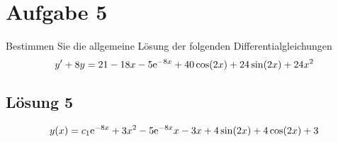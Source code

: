 \documentclass[main.tex]{subfiles}
\begin{document}
\section{Aufgabe 5}
Bestimmen Sie die allgemeine Lösung der folgenden Differentialgleichungen
\[
    y' + 8y = 21 - 18x - 5\mathrm{e}^{-8x} + 40\cos(2x) + 24\sin(2x) + 24x^2
\]

\subsection{Lösung 5}

$$
    y(x) = c_1 \mathrm{e}^{-8 x} + 3 x^2 - 5 \mathrm{e}^{-8 x} x - 3 x + 4 \sin(2 x) + 4 \cos(2 x) + 3
$$
\end{document}
